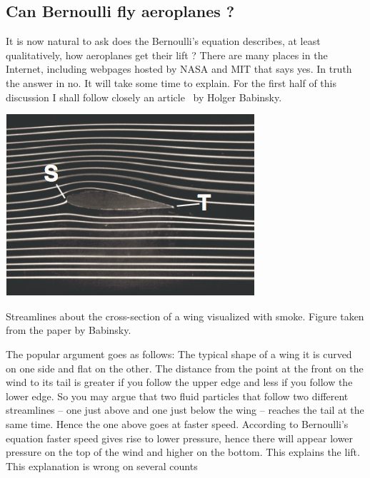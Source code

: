 \subsection{Can Bernoulli fly aeroplanes ?}
It is now natural to ask does the Bernoulli's equation describes, at least qualitatively, how aeroplanes get their lift ?
There are many places in the Internet, including webpages hosted by NASA and MIT that 
says yes. In truth the answer in no. It will take some time to explain. 
For the first half of this discussion I shall follow closely an 
article~\cite{babinsky2003wings} by Holger Babinsky.
\begin{marginfigure}
\includegraphics{figures/WingStreamlines.png}
\caption{Streamlines about the cross-section of a wing
visualized with smoke. Figure taken from the paper by Babinsky. }
\label{fig:WingStream}
\end{marginfigure}
The popular argument goes as follows: The typical shape of a wing it is curved 
on one side and flat on the other. The distance from the point at the front on 
the wind to its tail is greater if you follow the upper edge and less if you follow the 
lower edge. So you may argue that two fluid particles that follow two different
streamlines -- one just above and one just below the wing -- reaches the
tail at the same time. Hence the one above goes at faster speed. According
to Bernoulli's equation faster speed gives rise to lower pressure, hence 
there will appear lower pressure on the top of the wind and higher on the bottom. 
This explains the lift. This explanation is wrong on several counts 
